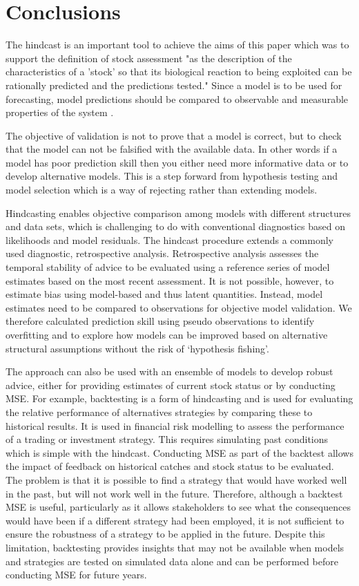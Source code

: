 \documentclass[12pt,halfline,a4paper,nonumbib]{ouparticle}
\begin{document}
\section{Conclusions}

The hindcast is an important tool to achieve the aims of this paper which was to support the definition of stock assessment "as the description of the characteristics of a ’stock’ so that its biological reaction to being exploited can be rationally predicted and the predictions tested." Since a model is to be used for forecasting, model predictions should be compared to observable and measurable properties of the system \parencite{ianelli2016multi}. 

The objective of validation is not to prove that a model is correct, but to check that the model can not be falsified with the available data. In other words if a model has poor prediction skill then you either need more informative data or to develop alternative models. This is a step forward from hypothesis testing and model selection which is a way of rejecting rather than extending models. 

Hindcasting enables objective comparison among models with different structures and data sets, which is challenging to do with conventional diagnostics based on likelihoods and model residuals. The hindcast procedure extends a commonly used diagnostic, retrospective analysis. Retrospective analysis assesses the temporal stability of advice to be evaluated using a reference series of model estimates based on the most recent assessment. It is not possible, however, to estimate bias using model-based and thus latent quantities. Instead, model estimates need to be compared to observations for objective model validation. We therefore calculated prediction skill using pseudo observations to identify overfitting and to explore how models can be improved based on alternative structural assumptions without the risk of ‘hypothesis fishing’. 

The approach can also be used with an ensemble of models to develop robust advice, either for providing estimates of current stock status or by conducting MSE. For example, backtesting is a form of hindcasting and is used for evaluating the relative performance of alternatives strategies by comparing these to historical results. It is used in financial risk modelling to assess the performance of a trading or investment strategy. This requires simulating past conditions which is simple with the hindcast. Conducting MSE as part of the backtest allows the impact of feedback on historical catches and stock status to be evaluated. The problem is that it is possible to find a strategy that would have worked well in the past, but will not work well in the future. Therefore, although a backtest MSE is useful, particularly as it allows stakeholders to see what the consequences would have been if a different strategy had been employed, it is not sufficient to ensure the robustness of a strategy to be applied in the future. Despite this limitation, backtesting provides insights that may not be available when models and strategies are tested on simulated data alone and can be performed before conducting MSE for future years.
\end{document}
